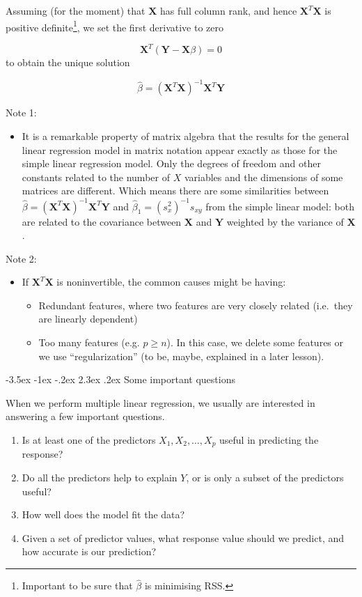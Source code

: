 \documentclass[]{book}
\makeatletter
\providecommand{\tightlist}{%
  \setlength{\itemsep}{0pt}\setlength{\parskip}{0pt}}
\let\rmarkdownfootnote\footnote%
\def\footnote{\protect\rmarkdownfootnote}
\newenvironment{rmdblock}[1]
  {\begin{shaded*}
  \begin{itemize}
  \renewcommand{\labelitemi}{
    \raisebox{-.7\height}[0pt][0pt]{
      {\setkeys{Gin}{width=2em,keepaspectratio}\texttt{[image: img/icons/\#1]}}
    }
  }
  \item
  }
  {
  \end{itemize}
  \end{shaded*}
  }
\newenvironment{rmdinsight}
  {\begin{rmdblock}{insight}}
  {\end{rmdblock}}
\renewcommand\section{\@startsection {section}{1}{\z@}%
                                   {-3.5ex \@plus -1ex \@minus -.2ex}%
                                   {2.3ex \@plus.2ex}%
                                   {\normalfont\Large\bfseries\color{ForestGreen}}}
\theoremstyle{definition}
\theoremstyle{definition}
\theoremstyle{definition}
\theoremstyle{remark}
\makeatother
\begin{document}
Assuming (for the moment) that \(\textbf{X}\) has full column rank, and
hence \(\textbf{X}^T\textbf{X}\) is positive definite\footnote{Important
  to be sure that \(\hat{\beta}\) is minimising RSS.}, we set the first
derivative to zero

\[\textbf{X}^T(\textbf{Y}-\textbf{X}\beta)=0\] to obtain the unique
solution

\[ \hat{\beta} = (\textbf{X}^T \textbf{X})^{-1}\textbf{X}^T \textbf{Y} \]

Note 1:

\begin{rmdinsight}
It is a remarkable property of matrix algebra that the results for the
general linear regression model in matrix notation appear exactly as
those for the simple linear regression model. Only the degrees of
freedom and other constants related to the number of \(X\) variables and
the dimensions of some matrices are different. Which means there are
some similarities between
\(\hat{\beta} = (\textbf{X}^T \textbf{X})^{-1}\textbf{X}^T \textbf{Y}\)
and \(\hat\beta_1=(s_x^2)^{-1}s_{xy}\) from the simple linear model:
both are related to the covariance between \(\mathbf{X}\) and
\(\mathbf{Y}\) weighted by the variance of \(\mathbf{X}\).
\end{rmdinsight}

Note 2:

\begin{rmdinsight}
If \(\textbf{X}^T \textbf{X}\) is noninvertible, the common causes might
be having:

\begin{itemize}
\tightlist
\item
  Redundant features, where two features are very closely related
  (i.e.~they are linearly dependent)
\item
  Too many features (e.g. \(p \geq n\)). In this case, we delete some
  features or we use ``regularization'' (to be, maybe, explained in a
  later lesson).
\end{itemize}
\end{rmdinsight}

\section{Some important questions}\label{some-important-questions}

When we perform multiple linear regression, we usually are interested in
answering a few important questions.

\begin{enumerate}
\def\labelenumi{\arabic{enumi}.}
\tightlist
\item
  Is at least one of the predictors \(X_1 ,X_2 ,\ldots,X_p\) useful in
  predicting the response?
\item
  Do all the predictors help to explain \(Y\), or is only a subset of
  the predictors useful?
\item
  How well does the model fit the data?
\item
  Given a set of predictor values, what response value should we
  predict, and how accurate is our prediction?
\end{enumerate}
\end{document}
